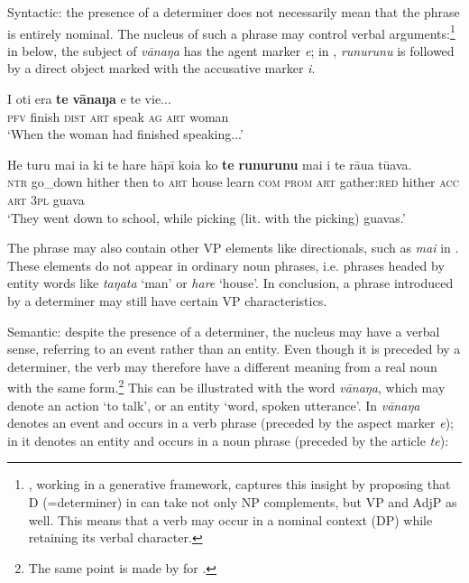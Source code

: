Syntactic: the presence of a determiner does not necessarily mean that the phrase is entirely nominal. The nucleus of such a phrase may control verbal arguments:\footnote{\label{fn:93}\citet{Waite1994}, working in a generative framework, captures this insight by proposing that D (=determiner) in  can take not only NP complements, but VP and AdjP as well. This means that a verb may occur in a nominal context (DP) while retaining its verbal character.} in  below, the subject of \textit{vānaŋa} has the agent marker \textit{e}; in , \textit{runurunu} is followed by a direct object marked with the accusative marker \textit{i}. 

\ea\label{ex:3.7}
\gll I oti era \textbf{te} \textbf{vānaŋa} e te vi{\ꞌ}e...\\
\textsc{pfv} finish \textsc{dist} \textsc{art} speak \textsc{ag} \textsc{art} woman\\

\glt 
‘When the woman had finished speaking...’ \textstyleExampleref{[Egt-01.095]}
\z

\ea\label{ex:3.8}
\gll He turu mai ia ki te hare hāpī koia ko \textbf{te} \textbf{runurunu} mai i te rāua tūava.\\
\textsc{ntr} go\_down hither then to \textsc{art} house learn \textsc{com} \textsc{prom} \textsc{art} gather:\textsc{red} hither \textsc{acc} \textsc{art} \textsc{3pl} guava\\

\glt
‘They went down to school, while picking (lit. with the picking) guavas.’ \textstyleExampleref{[R211.012]} 
\z

The phrase may also contain other VP elements like directionals, such as \textit{mai} in . These elements do not appear in ordinary noun phrases, i.e. phrases headed by entity words like \textit{taŋata} ‘man’ or \textit{hare} ‘house’. In conclusion, a phrase introduced by a determiner may still have certain VP characteristics.

Semantic: despite the presence of a determiner, the nucleus may have a verbal sense, referring to an event rather than an entity. Even though it is preceded by a determiner, the verb may therefore have a different meaning from a real noun with the same form.\footnote{\label{fn:94}The same point is made by \citet[511]{Besnier2000} for .} This can be illustrated with the word \textit{vānaŋa}, which may denote an action ‘to talk’, or an entity ‘word, spoken utterance’. In  \textit{vānaŋa} denotes an event and occurs in a verb phrase (preceded by the aspect marker \textit{e}); in  it denotes an entity and occurs in a noun phrase (preceded by the article \textit{te}):

